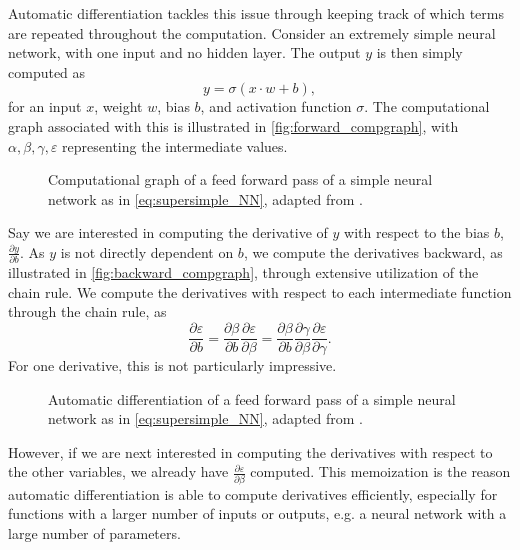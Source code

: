 Automatic differentiation tackles this issue through keeping track of which terms are repeated throughout the computation.
Consider an extremely simple neural network, with one input and no hidden layer.
The output $y$ is then simply computed as
\begin{equation}\label{eq:supersimple_NN}
    y = \sigma \left( x \cdot w + b \right),
\end{equation}
for an input $x$, weight $w$, bias $b$, and activation function $\sigma$.
The computational graph associated with this is illustrated in \autoref{fig:forward_compgraph}, with $\alpha, \beta, \gamma, \varepsilon$ representing the intermediate values.

\begin{figure}[h]
\centering

\caption{Computational graph of a feed forward pass of a simple neural network as in \eqref{eq:supersimple_NN}, adapted from \cite{autodiff}.}
\label{fig:forward_compgraph}
\end{figure}

Say we are interested in computing the derivative of $y$ with respect to the bias $b$, $\frac{\partial y}{\partial b}$.
As $y$ is not directly dependent on $b$, we compute the derivatives backward, as illustrated in \autoref{fig:backward_compgraph}, through extensive utilization of the chain rule.
We compute the derivatives with respect to each intermediate function through the chain rule, as
\begin{equation}
    \frac{\partial \varepsilon}{\partial b} = \frac{\partial \beta}{\partial b} \frac{\partial \varepsilon}{\partial \beta} = 
    \frac{\partial \beta}{\partial b}
    \frac{\partial \gamma}{\partial \beta}
    \frac{\partial \varepsilon}{\partial \gamma}.
\end{equation}
For one derivative, this is not particularly impressive.

\begin{figure}[h]
\centering

\caption{Automatic differentiation of a feed forward pass of a simple neural network as in \eqref{eq:supersimple_NN}, adapted from \cite{autodiff}.}
\label{fig:backward_compgraph}
\end{figure}

However, if we are next interested in computing the derivatives with respect to the other variables, we already have $\frac{\partial \varepsilon}{\partial \beta}$ computed.
This memoization is the reason automatic differentiation is able to compute derivatives efficiently, especially for functions with a larger number of inputs or outputs, e.g. a neural network with a large number of parameters.




